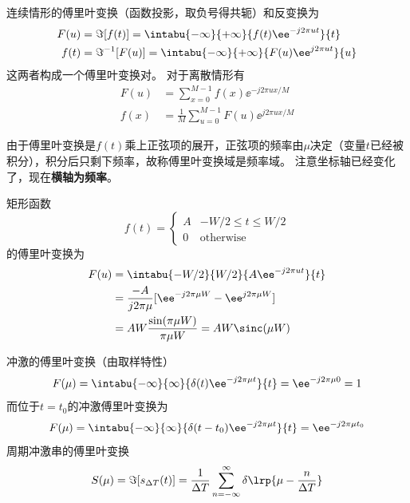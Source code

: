 \begin{definition}[傅里叶变换与反变换]
连续情形的傅里叶变换（函数投影，取负号得共轭）和反变换为
\[\begin{aligned}
F(u)&=\Im[f(t)]=\intabu{-\infty}{+\infty}{f(t)\ee^{-j 2\pi ut}}{t}\\
f(t)&=\Im^{-1}[F(u)]=\intabu{-\infty}{+\infty}{F(u)\ee^{j 2\pi ut}}{u}
\end{aligned}\]
这两者构成一个傅里叶变换对。
对于离散情形有
\[\begin{aligned}
F(u)&=\sum_{x=0}^{M-1}f(x)\ee^{-j2\pi ux/M}\\
f(x)&=\frac{1}{M}\sum_{u=0}^{M-1}F(u)\ee^{j2\pi ux/M}
\end{aligned}\]
\end{definition}
由于傅里叶变换是$f(t)$乘上正弦项的展开，正弦项的频率由$\mu$决定（变量$t$已经被积分），积分后只剩下频率，故称傅里叶变换域是频率域。
注意坐标轴已经变化了，现在\textbf{横轴为频率}。

\begin{example}
矩形函数
\[f(t)=\begin{cases}
A & -W/2\leq t\leq W/2\\
0 & \text{otherwise}
\end{cases}\]
的傅里叶变换为
\[\begin{aligned}
F(u)&=\intabu{-W/2}{W/2}{A\ee^{-j2\pi ut}}{t}\\
&=\frac{-A}{j2\pi\mu}[\ee^{-j2\pi\mu W}-\ee^{j2\pi\mu W}]\\
&=AW\frac{\sin(\pi\mu W)}{\pi\mu W}=AW\sinc(\mu W)
\end{aligned}\]
\end{example}
\begin{example}
冲激的傅里叶变换（由取样特性）
\[F(\mu)=\intabu{-\infty}{\infty}{\delta(t)\ee^{-j2\pi\mu t}}{t}=\ee^{-j2\pi\mu 0}=1\]
而位于$t=t_0$的冲激傅里叶变换为
\[F(\mu)=\intabu{-\infty}{\infty}{\delta(t-t_0)\ee^{-j2\pi\mu t}}{t}=\ee^{-j2\pi\mu t_0}\]
周期冲激串的傅里叶变换
\[S(\mu)=\Im[s_{\Delta T}(t)]=\frac{1}{\Delta T}\sum_{n=-\infty}^{\infty}\delta\lrp{\mu-\frac{n}{\Delta T}}\]
\end{example}

